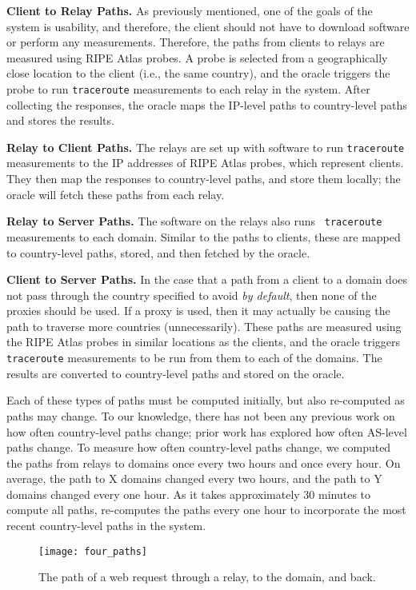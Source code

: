 {\bf Client to Relay Paths.} As previously mentioned, one of the goals of the 
system is usability, and therefore, the client should not have to download software 
or perform any measurements.  Therefore, 
the paths from clients to relays are measured using RIPE Atlas probes.  A probe 
is selected from a geographically close location to the client (i.e., the same 
country), and the oracle triggers the probe to run {\tt traceroute} measurements 
to each relay in the system.  After collecting the responses, the oracle maps 
the IP-level paths to country-level paths and stores the results.

{\bf Relay to Client Paths.} The relays are set up with software to run 
{\tt traceroute} measurements to the IP addresses of RIPE Atlas probes, which 
represent clients.  They then map the responses to country-level paths, and 
store them locally; the oracle will fetch these paths from each relay. 

{\bf Relay to Server Paths.} The software on the relays also runs {\tt 
traceroute} measurements to each domain.  Similar to the paths to clients, these 
are mapped to country-level paths, stored, and then fetched by the oracle.

{\bf Client to Server Paths.} In the case that a path from a client to a 
domain does not pass through the country specified to avoid {\it by default}, 
then none of the proxies should be used.  If a proxy is used, then it may 
actually be causing the path to traverse more countries (unnecessarily).  These 
paths are measured using the RIPE Atlas probes in similar locations as the 
clients, and the oracle triggers {\tt traceroute} measurements to be run from 
them to each of the domains.  The results are converted to country-level paths 
and stored on the oracle.  

Each of these types of paths must be computed initially, but also re-computed 
as paths may change.  To our knowledge, there has not been any previous work 
on how often country-level paths change; prior work has explored how often 
AS-level paths change.  To measure how often country-level paths change, we 
computed the paths from relays to domains once every two hours and once every 
hour.  On average, the path to X domains changed every two hours, and the path 
to Y domains changed every one hour.  As it takes approximately 30 minutes to 
compute all paths, \system{} re-computes the paths every one hour to incorporate 
the most recent country-level paths in the system.

\begin{figure}[t]
\centering
\texttt{[image: four\_paths]}
\caption{The path of a web request through a \system{} relay, to the domain, and back.}
\label{fig:path_components}
\end{figure}

